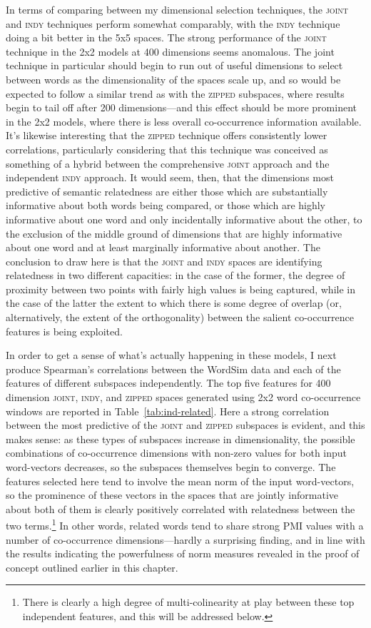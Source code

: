 In terms of comparing between my dimensional selection techniques, the \textsc{joint} and \textsc{indy} techniques perform somewhat comparably, with the \textsc{indy} technique doing a bit better in the 5x5 spaces.  The strong performance of the \textsc{joint} technique in the 2x2 models at 400 dimensions seems anomalous.  The joint technique in particular should begin to run out of useful dimensions to select between words as the dimensionality of the spaces scale up, and so would be expected to follow a similar trend as with the \textsc{zipped} subspaces, where results begin to tail off after 200 dimensions---and this effect should be more prominent in the 2x2 models, where there is less overall co-occurrence information available.  It's likewise interesting that the \textsc{zipped} technique offers consistently lower correlations, particularly considering that this technique was conceived as something of a hybrid between the comprehensive \textsc{joint} approach and the independent \textsc{indy} approach.  It would seem, then, that the dimensions most predictive of semantic relatedness are either those which are substantially informative about both words being compared, or those which are highly informative about one word and only incidentally informative about the other, to the exclusion of the middle ground of dimensions that are highly informative about one word and at least marginally informative about another.  The conclusion to draw here is that the \textsc{joint} and \textsc{indy} spaces are identifying relatedness in two different capacities: in the case of the former, the degree of proximity between two points with fairly high values is being captured, while in the case of the latter the extent to which there is some degree of overlap (or, alternatively, the extent of the orthogonality) between the salient co-occurrence features is being exploited.

In order to get a sense of what's actually happening in these models, I next produce Spearman's correlations between the WordSim data and each of the features of different subspaces independently.  The top five features for 400 dimension \textsc{joint}, \textsc{indy}, and \textsc{zipped} spaces generated using 2x2 word co-occurrence windows are reported in Table~\ref{tab:ind-related}.  Here a strong correlation between the most predictive of the \textsc{joint} and \textsc{zipped} subspaces is evident, and this makes sense: as these types of subspaces increase in dimensionality, the possible combinations of co-occurrence dimensions with non-zero values for both input word-vectors decreases, so the subspaces themselves begin to converge.  The features selected here tend to involve the mean norm of the input word-vectors, so the prominence of these vectors in the spaces that are jointly informative about both of them is clearly positively correlated with relatedness between the two terms.\footnote{There is clearly a high degree of multi-colinearity at play between these top independent features, and this will be addressed below.}  In other words, related words tend to share strong PMI values with a number of co-occurrence dimensions---hardly a surprising finding, and in line with the results indicating the powerfulness of norm measures revealed in the proof of concept outlined earlier in this chapter.

